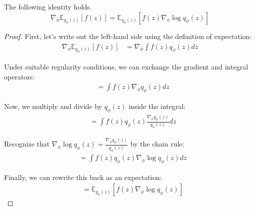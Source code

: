 \documentclass{article}
\begin{document}
  \begin{lemma}
    The following identity holds. 
    \begin{equation}
      \nabla_\phi \mathbb{E}_{q_\phi(z)}[f(z)] = \mathbb{E}_{q_\phi(z)}[f(z)\nabla_\phi \log q_\phi(z)]
    \end{equation}
  \end{lemma}
  \begin{proof}
    First, let's write out the left-hand side using the definition of expectation:
    \begin{align*}
    \nabla_\phi \mathbb{E}_{q_\phi(z)}[f(z)] &= \nabla_\phi \int f(z)q_\phi(z)dz
    \end{align*}

    Under suitable regularity conditions, we can exchange the gradient and integral operators:
    \begin{align*}
    &= \int f(z)\nabla_\phi q_\phi(z)dz
    \end{align*}

    Now, we multiply and divide by $q_\phi(z)$ inside the integral:
    \begin{align*}
    &= \int f(z) q_\phi(z) \frac{\nabla_\phi q_\phi(z)}{q_\phi(z)} dz
    \end{align*}

    Recognize that $\nabla_\phi \log q_\phi(z) = \frac{\nabla_\phi q_\phi(z)}{q_\phi(z)}$ by the chain rule:
    \begin{align*}
    &= \int f(z) q_\phi(z) \nabla_\phi \log q_\phi(z) dz
    \end{align*}

    Finally, we can rewrite this back as an expectation:
    \begin{align*}
    &= \mathbb{E}_{q_\phi(z)}[f(z)\nabla_\phi \log q_\phi(z)]
    \end{align*}
  \end{proof}
\end{document}
